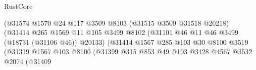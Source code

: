 \begin{lexlean}{RustCore}
\begin{coremodule}
                                                  (@31574
                                                    @1570
                                                    @24
                                                    @117
                                                    @3509
                                                    @8103
                                                    (@31515 @3509 @31518 @20218)
                                                    (@31414
                                                      @265
                                                      @1569
                                                      @11
                                                      @105
                                                      @3499
                                                      @8102
                                                      (@31101
                                                        @46
                                                        @11
                                                        @46
                                                        @3499
                                                        (@18731 (@31106 @46))
                                                        @20133)
                                                      (@31414
                                                        @1567
                                                        @285
                                                        @103
                                                        @30
                                                        @8100
                                                        @3519
                                                        (@31319
                                                          @1567
                                                          @103
                                                          @8100
                                                          (@31399
                                                            @315
                                                            @853
                                                            @49
                                                            @103
                                                            @3428
                                                            @4567
                                                            @3532
                                                            @2074
                                                            (@31409

\end{coremodule}
\end{lexlean}
